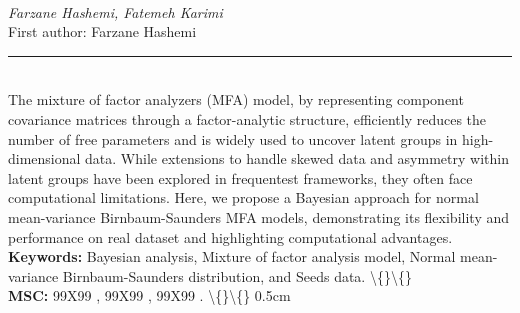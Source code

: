 \documentclass[10pt,twoside]{article}
\begin{document}
\noindent\begin{minipage}[t][\textheight]{\textwidth}
\\[0.35em]
{\itshape Farzane Hashemi, Fatemeh Karimi}\\[0.2em]
{\footnotesize First author: Farzane Hashemi}\\[0.45em]
\noindent\rule{\textwidth}{0.3pt}\\[0.4em]
{\footnotesize  The mixture of factor analyzers (MFA) model, by representing component covariance matrices through a factor-analytic structure, efficiently reduces the number of free parameters and is widely used to uncover latent groups in high-dimensional data. While extensions to handle skewed data and asymmetry within latent groups have been explored in frequentest frameworks, they often face computational limitations. Here, we propose a Bayesian approach for normal mean-variance Birnbaum-Saunders MFA models, demonstrating its flexibility and performance on real dataset and highlighting computational advantages.}\\[0.4em]
{\footnotesize\bfseries Keywords:} {\footnotesize Bayesian analysis, Mixture of factor analysis model, Normal mean-variance Birnbaum-Saunders distribution, and Seeds data. \textbackslash\{\}\textbackslash\{\}}\\[0.15em]
{\footnotesize\bfseries MSC:} {\footnotesize 99X99 , 99X99 , 99X99 . \textbackslash\{\}\textbackslash\{\} 0.5cm}\\
\vfill
\end{minipage}
\newpage
\end{document}
